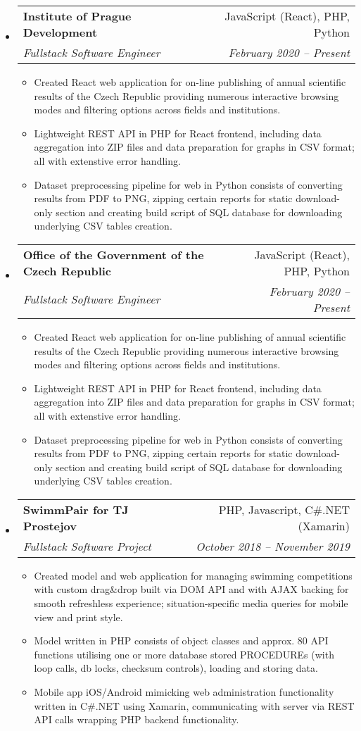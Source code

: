 \documentclass[letterpaper,11pt]{article}
\makeatletter
\newcommand{\sitem}[1]{\item #1 \vspace{-2pt}}
\newcommand{\resumeSubheading}[4]{
  \vspace{-1pt}\item
    \begin{tabular*}{0.97\textwidth}[t]{l@{\extracolsep{\fill}}r}
      \textbf{#1} & #2 \\
      \textit{\small#3} & \textit{\small #4} \\
    \end{tabular*}\vspace{-5pt}
}
\newenvironment{subheadingListing}{\begin{itemize}[leftmargin=*]}{\end{itemize}}
\newenvironment{resumeList}{\begin{itemize}}{\end{itemize}\vspace{-5pt}}
\makeatother
\begin{document}
\begin{subheadingListing}

  \resumeSubheading
  {Institute of Prague Development}{JavaScript (React), PHP, Python}
  {Fullstack Software Engineer}{February 2020 – Present}
  \begin{resumeList}
    \sitem{Created React web application for on-line publishing of annual scientific results of the Czech Republic providing numerous interactive browsing modes and filtering options across fields and institutions.}
    \sitem{Lightweight REST API in PHP for React frontend, including data aggregation into ZIP files and data preparation for graphs in CSV format; all with extenstive error handling.}
    \sitem{Dataset preprocessing pipeline for web in Python consists of converting results from PDF to PNG, zipping certain reports for static download-only section and creating build script of SQL database for downloading underlying CSV tables creation.}
  \end{resumeList}

  \resumeSubheading
  {Office of the Government of the Czech Republic}{JavaScript (React), PHP, Python}
  {Fullstack Software Engineer}{February 2020 – Present}
  \begin{resumeList}
    \sitem{Created React web application for on-line publishing of annual scientific results of the Czech Republic providing numerous interactive browsing modes and filtering options across fields and institutions.}
    \sitem{Lightweight REST API in PHP for React frontend, including data aggregation into ZIP files and data preparation for graphs in CSV format; all with extenstive error handling.}
    \sitem{Dataset preprocessing pipeline for web in Python consists of converting results from PDF to PNG, zipping certain reports for static download-only section and creating build script of SQL database for downloading underlying CSV tables creation.}
  \end{resumeList}

  \resumeSubheading
  {SwimmPair for TJ Prostejov}{PHP, Javascript, C\#.NET (Xamarin)}
  {Fullstack Software Project}{October 2018 – November 2019}
  \begin{resumeList}
    \sitem{Created model and web application for managing swimming competitions with custom drag\&drop built via DOM API and with AJAX backing for smooth refreshless experience; situation-specific media queries for mobile view and print style.}
    \sitem{Model written in PHP consists of object classes and approx. 80 API functions utilising one or more database stored PROCEDUREs (with loop calls, db locks, checksum controls), loading and storing data.}
    \sitem{Mobile app iOS/Android mimicking web administration functionality written in C\#.NET using Xamarin, communicating with server via REST API calls wrapping PHP backend functionality.}
  \end{resumeList}


\end{subheadingListing}
\end{document}

